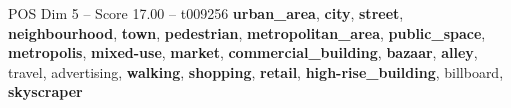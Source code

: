 \begin{textsample}{POS Dim 5 – Score 17.00 – t009256}  \label{ex:f5_pos_023}
\textbf{urban\_area}, \textbf{city}, \textbf{street}, \textbf{neighbourhood}, \textbf{town}, \textbf{pedestrian}, \textbf{metropolitan\_area}, \textbf{public\_space}, \textbf{metropolis}, \textbf{mixed-use}, \textbf{market}, \textbf{commercial\_building}, \textbf{bazaar}, \textbf{alley}, travel, advertising, \textbf{walking}, \textbf{shopping}, \textbf{retail}, \textbf{high-rise\_building}, billboard, \textbf{skyscraper}

\end{textsample}
